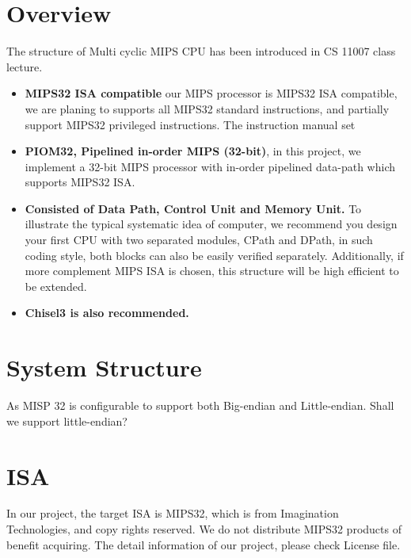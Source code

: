 \documentclass[a4paper]{article}
\begin{document}
\section{Overview} \label{overview}%
The structure of Multi cyclic MIPS CPU has been introduced in CS 11007 class lecture.
\begin{itemize}
	\item{\textbf{MIPS32 ISA compatible} our MIPS processor is MIPS32 ISA compatible, we are planing to supports all MIPS32 standard instructions, and partially support MIPS32 privileged instructions. The instruction manual set }
    \item{\textbf{PIOM32, Pipelined in-order MIPS (32-bit)}, in this project, we implement a 32-bit MIPS processor with in-order pipelined data-path which supports MIPS32 ISA.}
    \item{\textbf{Consisted of Data Path, Control Unit and Memory Unit.} To illustrate the typical systematic idea of computer, we recommend you design your first CPU with two separated modules, CPath and DPath, in such coding style, both blocks can also be easily verified separately. Additionally, if more complement MIPS ISA is chosen, this structure will be high efficient to be extended.}
    \item{\textbf{Chisel3 is also recommended.}}
\end{itemize}


\newpage
\section{System Structure} \label{Specification}%
As MISP 32 is configurable to support both Big-endian and Little-endian. Shall we support little-endian?

\newpage
\section{ISA}\label{isa}%
In our project, the target ISA is MIPS32, which is from Imagination Technologies, and copy rights reserved. We do not distribute MIPS32 products of benefit acquiring. The detail information of our project, please check License file. 
\end{document}
